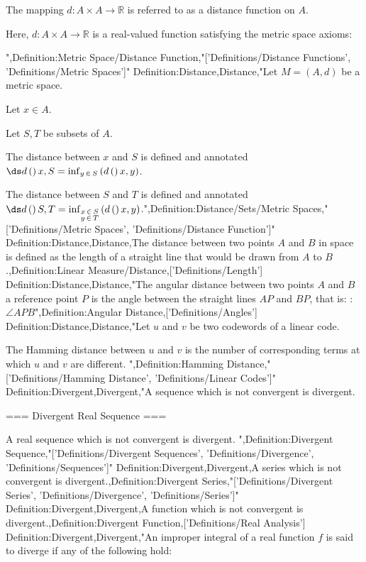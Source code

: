 The mapping $d: A \times A \to \mathbb R$ is referred to as a distance function on $A$.


Here, $d: A \times A \to \mathbb R$ is a real-valued function satisfying the metric space axioms:

",Definition:Metric Space/Distance Function,"['Definitions/Distance Functions', 'Definitions/Metric Spaces']"
Definition:Distance,Distance,"Let $M = \left( A, d \right)$ be a metric space.

Let $x \in A$.

Let $S, T$ be subsets of $A$.


The distance between $x$ and $S$ is defined and annotated $\ds d \left(   \right){x, S} = \inf_{y \mathop \in S} \left( d \left(   \right){x, y}  \right)$.

The distance between $S$ and $T$ is defined and annotated $\ds d \left(   \right){S, T} = \inf_{\substack {x \mathop \in S \\ y \mathop \in T} } \left( d \left(   \right){x, y}  \right)$.",Definition:Distance/Sets/Metric Spaces,"['Definitions/Metric Spaces', 'Definitions/Distance Function']"
Definition:Distance,Distance,The distance between two points $A$ and $B$ in space is defined as the length of a straight line that would be drawn from $A$ to $B$.,Definition:Linear Measure/Distance,['Definitions/Length']
Definition:Distance,Distance,"The angular distance between two points $A$ and $B$  a reference point $P$ is the angle between the straight lines $AP$ and $BP$, that is:
:$\angle APB$",Definition:Angular Distance,['Definitions/Angles']
Definition:Distance,Distance,"Let $u$ and $v$ be two codewords of a linear code.

The Hamming distance between $u$ and $v$ is the number of corresponding terms at which $u$ and $v$ are different.
",Definition:Hamming Distance,"['Definitions/Hamming Distance', 'Definitions/Linear Codes']"
Definition:Divergent,Divergent,"A sequence which is not convergent is divergent.



=== Divergent Real Sequence ===

A real sequence which is not convergent is divergent.
",Definition:Divergent Sequence,"['Definitions/Divergent Sequences', 'Definitions/Divergence', 'Definitions/Sequences']"
Definition:Divergent,Divergent,A series which is not convergent is divergent.,Definition:Divergent Series,"['Definitions/Divergent Series', 'Definitions/Divergence', 'Definitions/Series']"
Definition:Divergent,Divergent,A function which is not convergent is divergent.,Definition:Divergent Function,['Definitions/Real Analysis']
Definition:Divergent,Divergent,"An improper integral of a real function $f$ is said to diverge if any of the following hold:

